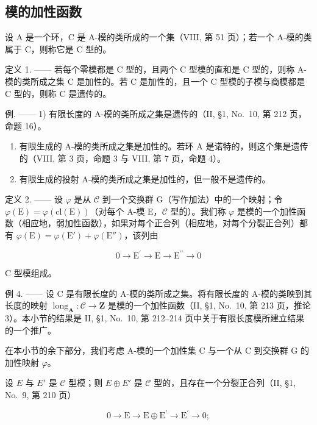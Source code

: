 \subsection{模的加性函数}

设 A 是一个环，C 是 A-模的类所成的一个集（VIII, 第 51 页）；若一个 A-模的类属于 C，则称它是 C 型的。

定义 1. —— 若每个零模都是 C 型的，且两个 C 型模的直和是 C 型的，则称 A-模的类所成之集 C 是加性的。若 C 是加性的，且一个 C 型模的子模与商模都是 C 型的，则称 C 是遗传的。

例. —— 1) 有限长度的 A-模的类所成之集是遗传的（II, §1, No.~10, 第 212 页，命题 16）。

\begin{enumerate}
\def\labelenumi{\arabic{enumi})}
\setcounter{enumi}{1}
\item
  有限生成的 A-模的类所成之集是加性的。若环 A 是诺特的，则这个集是遗传的（VIII, 第 3 页，命题 3 与 VIII, 第 7 页，命题 4）。
\item
  有限生成的投射 A-模的类所成之集是加性的，但一般不是遗传的。
\end{enumerate}

定义 2. —— 设 \(\varphi\) 是从 \(\mathcal{C}\) 到一个交换群 G（写作加法）中的一个映射；令 \(\varphi(\mathrm{E}) = \varphi(\mathrm{cl}(\mathrm{E}))\)（对每个 A-模 E，\(\mathcal{C}\) 型的）。我们称 \(\varphi\) 是模的一个加性函数（相应地，弱加性函数），如果对每个正合列（相应地，对每个分裂正合列）都有 \(\varphi(\mathrm{E}) = \varphi(\mathrm{E}') + \varphi(\mathrm{E}'')\)，该列由

\[
0 \longrightarrow \mathrm{E} ^ {\prime} \longrightarrow \mathrm{E} \longrightarrow \mathrm{E} ^ {\prime \prime} \longrightarrow 0
\]

C 型模组成。

例 4. —— 设 C 是有限长度的 A-模的类所成之集。将有限长度的 A-模的类映到其长度的映射 \(\operatorname{long}_{\mathbf{A}} : \mathcal{C} \to \mathbf{Z}\) 是模的一个加性函数（II, §1, No.~10, 第 213 页，推论 3）。本小节的结果是 II, §1, No.~10, 第 212--214 页中关于有限长度模所建立结果的一个推广。

在本小节的余下部分，我们考虑 A-模的一个加性集 C 与一个从 C 到交换群 G 的加性映射 \(\varphi\)。

设 \(E\) 与 \(E'\) 是 \(\mathcal{C}\) 型模；则 \(E \oplus E'\) 是 \(\mathcal{C}\) 型的，且存在一个分裂正合列（II, §1, No.~9, 第 210 页）

\[
0 \longrightarrow \mathrm{E} \longrightarrow \mathrm{E} \oplus \mathrm{E} ^ {\prime} \longrightarrow \mathrm{E} ^ {\prime} \longrightarrow 0;
\]

